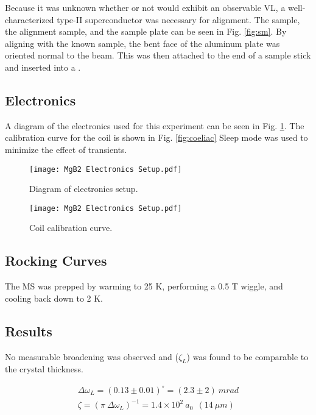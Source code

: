 \documentclass[aps, prl, reprint, groupedaddress, superscriptaddress, twocolumn]{revtex4-1}
\begin{document}
	
	Because it was unknown whether or not \SIT would exhibit an observable VL, a well-characterized type-II superconductor was necessary for alignment.  
	The \SIT sample, the alignment sample, and the sample plate can be seen in Fig. \ref{fig:sm}.
	By aligning with the known sample, the bent face of the aluminum plate was oriented normal to the beam.  
	This was then attached to the end of a sample stick and inserted into a \dr.	


	\subsection{Electronics}
	A diagram of the electronics used for this experiment can be seen in Fig. \ref{fig:electronics}.  The calibration curve for the coil is shown in Fig. \ref{fig:coeliac}
	Sleep mode was used to minimize the effect of transients.
	
		\begin{figure}[h!]
			\texttt{[image: MgB2 Electronics Setup.pdf]}
			\caption{\label{fig:electronics} Diagram of electronics setup.}
		\end{figure}
		
		\begin{figure}[h!]
			\texttt{[image: MgB2 Electronics Setup.pdf]}
			\caption{\label{fig:coilcal} Coil calibration curve.}
		\end{figure}	
	

	\subsection{Rocking Curves} 	
	The MS was prepped by warming to 25 K, performing a 0.5 T wiggle, and cooling back down to 2 K.
	
	
	\subsection{Results}
	No measurable broadening was observed and ($\zeta_L$) was found to be comparable to the crystal thickness.


	\begin{equation}
		\begin{split}
		\Delta \omega_L = (0.13 \pm 0.01) ^{\circ} = (2.3 \pm 2) ~mrad
		\\
		\zeta = (\pi ~\Delta \omega_L)^{-1} =1.4 \times 10^2  ~a_0 ~~(14 ~\mu m)
		\end{split}
	\end{equation}
		
\end{document}
